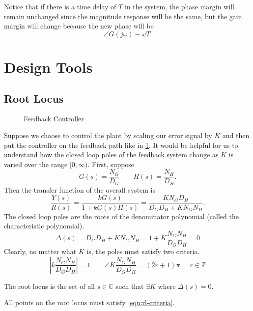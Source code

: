 Notice that if there is a time delay of $T$ in the system, the phase margin will remain unchanged since the magnitude response will be the same, but the gain margin will change because the new phase will be
\[
  \angle G(j\omega) - \omega T.
\]
\section{Design Tools}
\subsection{Root Locus}
\begin{figure}[H]
    \centering 
    \caption{Feedback Controller}
    \label{fig:rl-feedback-controller}
\end{figure}
Suppose we choose to control the plant by scaling our error signal by $K$ and then put the controller on the feedback path like in \cref{fig:rl-feedback-controller}.
It would be helpful for us to understand how the closed loop poles of the feedback system change as $K$ is varied over the range $[0, \infty)$.
First, suppose
\[
  G(s) = \frac{N_G}{D_G} \qquad H(s) = \frac{N_H}{D_H}.
\]
Then the transfer function of the overall system is
\[
  \frac{Y(s)}{R(s)} = \frac{kG(s)}{1+kG(s)H(s)} = \frac{KN_GD_H}{D_GD_H+KN_GN_H}.
\]
The closed loop poles are the roots of the denominator polynomial (called the characteristic polynomial).
\begin{equation}
  \Delta(s) = D_GD_H+KN_GN_H = 1 + K\frac{N_GN_H}{D_GD_H} = 0
  \label{eqn:rl-character-poly}
\end{equation}
Clearly, no matter what $K$ is, the poles must satisfy two criteria.
\begin{equation}
  \left|k\frac{N_GN_H}{D_GD_H}\right| = 1 \qquad \angle K\frac{N_GN_H}{D_GD_H} = (2r+1)\pi,\quad r\in\mathbb{Z}
  \label{eqn:rl-criteria}
\end{equation}
\begin{definition}
  The root locus is the set of all $s\in\mathbb{C}$ such that $\exists K$ where $\Delta(s) = 0$.
  \label{defn:root-locus}
\end{definition}
All points on the root locus must satisfy \cref{eqn:rl-criteria}.
